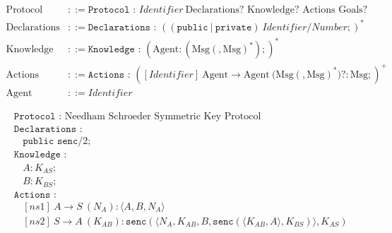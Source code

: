 \begin{figure}[htbp]
    \centering
    \begin{minipage}{0.8\textwidth}{\small
        \centering
        \begin{align*}
            \text{Protocol} &::= \texttt{Protocol : } \textit{Identifier} \ \text{Declarations}? \text{ Knowledge}? \text{ Actions Goals}?\\
            \text{Declarations} &::= \texttt{Declarations : } ((\texttt{public} \ | \ \texttt{private}) \ \textit{Identifier}/\textit{Number};)^{*}\\
            \text{Knowledge} &::= \texttt{Knowledge : } (\text{Agent} : (\text{Msg}(,\text{Msg})^{*}) ;)^{*}\\
            \text{Actions} &::= \texttt{Actions : } ([\textit{Identifier}] \ \text{Agent} \to \text{Agent} \ \texttt{(}\text{Msg}(,\text{Msg})^{*}\texttt{)}? : \text{Msg};)^{+}\\
            \text{Agent} &::= \textit{Identifier}
        \end{align*}}
        \label{fig:anbgrammar}
    \end{minipage}
    \hfill
    \begin{minipage}{0.8\textwidth}{\small
        \begin{align*}
            &\texttt{Protocol : } \text{Needham Schroeder Symmetric Key Protocol}\\
            &\texttt{Declarations : }\\
            &\ \ \ \ \texttt{public senc}/2;\\
            &\texttt{Knowledge : }\\
            &\ \ \ \ A : K_{AS};\\
            &\ \ \ \ B : K_{BS};\\
            &\texttt{Actions : }\\
            &\ \ \ \ [ns1] \ A \to S \ (N_A) : \langle A, B, N_A \rangle\\
            &\ \ \ \ [ns2] \ S \to A \ (K_{AB}) : \texttt{senc}(\langle N_A, K_{AB}, B, \texttt{senc}(\langle K_{AB}, A \rangle, K_{BS}) \rangle, K_{AS})\\

\end{align*}}
\end{minipage}
\end{figure}
